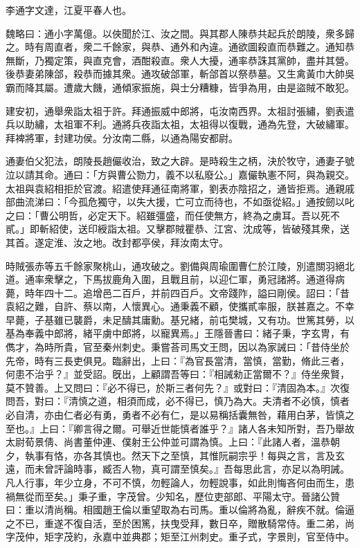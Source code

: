 
\begin{pinyinscope}
李通字文達，江夏平春人也。

魏略曰：通小字萬億。以俠聞於江、汝之間。與其郡人陳恭共起兵於朗陵，衆多歸之。時有周直者，衆二千餘家，與恭、通外和內違。通欲圖殺直而恭難之。通知恭無斷，乃獨定策，與直克會，酒酣殺直。衆人大擾，通率恭誅其黨帥，盡并其營。後恭妻弟陳郃，殺恭而據其衆。通攻破郃軍，斬郃首以祭恭墓。又生禽黃巾大帥吳霸而降其屬。遭歲大饑，通傾家振施，與士分糟糠，皆爭為用，由是盜賊不敢犯。

建安初，通舉衆詣太祖于許。拜通振威中郎將，屯汝南西界。太祖討張繡，劉表遣兵以助繡，太祖軍不利。通將兵夜詣太祖，太祖得以復戰，通為先登，大破繡軍。拜裨將軍，封建功侯。分汝南二縣，以通為陽安都尉。

通妻伯父犯法，朗陵長趙儼收治，致之大辟。是時殺生之柄，決於牧守，通妻子號泣以請其命。通曰：「方與曹公勠力，義不以私廢公。」嘉儼執憲不阿，與為親交。太祖與袁紹相拒於官渡。紹遣使拜通征南將軍，劉表亦陰招之，通皆拒焉。通親戚部曲流涕曰：「今孤危獨守，以失大援，亡可立而待也，不如亟從紹。」通按劒以叱之曰：「曹公明哲，必定天下。紹雖彊盛，而任使無方，終為之虜耳。吾以死不貳。」即斬紹使，送印綬詣太祖。又擊郡賊瞿恭、江宮、沈成等，皆破殘其衆，送其首。遂定淮、汝之地。改封都亭侯，拜汝南太守。

時賊張赤等五千餘家聚桃山，通攻破之。劉備與周瑜圍曹仁於江陵，別遣關羽絕北道。通率衆擊之，下馬拔鹿角入圍，且戰且前，以迎仁軍，勇冠諸將。通道得病薨，時年四十二。追增邑二百戶，并前四百戶。文帝踐阼，謚曰剛侯。詔曰：「昔袁紹之難，自許、蔡以南，人懷異心。通秉義不顧，使攜貳率服，朕甚嘉之。不幸早薨，子基雖已襲爵，未足醻其庸勳。基兄緒，前屯樊城，又有功。世篤其勞，以基為奉義中郎將，緒平虜中郎將，以寵異焉。」王隱晉書曰：緒子秉，字玄冑，有儁才，為時所貴，官至秦州刺史。秉嘗荅司馬文王問，因以為家誡曰：「昔侍坐於先帝，時有三長吏俱見。臨辭出，上曰：『為官長當清，當慎，當勤，脩此三者，何患不治乎？』並受詔。旣出，上顧謂吾等曰：『相誡勑正當爾不？』侍坐衆賢，莫不贊善。上又問曰：『必不得已，於斯三者何先？』或對曰：『清固為本。』次復問吾，對曰：『清慎之道，相須而成，必不得已，慎乃為大。夫清者不必慎，慎者必自清，亦由仁者必有勇，勇者不必有仁，是以易稱括囊無咎，藉用白茅，皆慎之至也。』上曰：『卿言得之爾。可舉近世能慎者誰乎？』諸人各未知所對，吾乃舉故太尉荀景倩、尚書董仲連、僕射王公仲並可謂為慎。上曰：『此諸人者，溫恭朝夕，執事有恪，亦各其慎也。然天下之至慎，其惟阮嗣宗乎！每與之言，言及玄遠，而未曾評論時事，臧否人物，真可謂至慎矣。』吾每思此言，亦足以為明誡。凡人行事，年少立身，不可不慎，勿輕論人，勿輕說事，如此則悔吝何由而生，患禍無從而至矣。」秉子重，字茂曾。少知名，歷位吏部郎、平陽太守。晉諸公贊曰：重以清尚稱。相國趙王倫以重望取為右司馬。重以倫將為亂，辭疾不就。倫逼之不已，重遂不復自活，至於困篤，扶曳受拜，數日卒，贈散騎常侍。重二弟，尚字茂仲，矩字茂約，永嘉中並典郡；矩至江州刺史。重子式，字景則，官至侍中。


\end{pinyinscope}